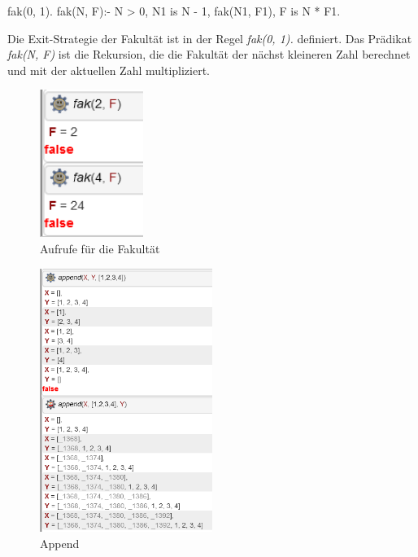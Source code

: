 \newline
\begin{code}[language=prolog, caption={Fakultät}, label={lst:Aufgabe5a}]
fak(0, 1).
fak(N, F):-
    N > 0,
    N1 is N - 1,
    fak(N1, F1),
    F is N * F1.
\end{code}
\newline
Die Exit-Strategie der Fakultät ist in der Regel \textit{fak(0, 1).} definiert.
Das Prädikat \textit{fak(N, F)} ist die Rekursion, die die Fakultät der nächst kleineren Zahl berechnet und mit der aktuellen Zahl multipliziert.
\newline
\begin{figure}[H]
    \centering
	\includegraphics[width=0.3\textwidth]{media/Aufgabe5a_fak}
	\caption{Aufrufe für die Fakultät}
	\label{img:Aufgabe5a_fak}
\end{figure}
\newline

\begin{figure}[H]
    \centering
	\includegraphics[width=0.5\textwidth]{media/Aufgabe5a_append}
	\caption{Append}
	\label{img:Aufgabe5a_append}
\end{figure}

